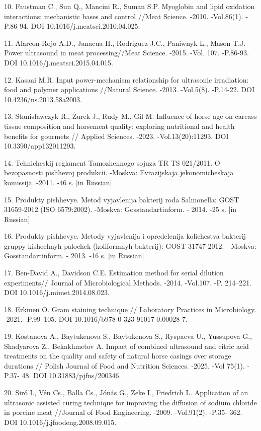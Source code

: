 \begin{refs}
10. Faustman C., Sun Q., Mancini R., Suman S.P. Myoglobin and lipid
oxidation interactions: mechanistic bases and control //Meat Science.
-2010. -Vol.86(1). -P.86-94. DOI 10.1016/j.meatsci.2010.04.025.

11. Alarcon-Rojo A.D., Janacua H., Rodriguez J.C., Paniwnyk L., Mason
T.J. Power ultrasound in meat processing//Meat Science. -2015. -Vol.
107. -P.86-93. DOI 10.1016/j.meatsci.2015.04.015.

12. Kasaai M.R. Input power-mechanism relationship for ultrasonic
irradiation: food and polymer applications //Natural Science. -2013.
-Vol.5(8). -P.14-22. DOI 10.4236/ns.2013.58a2003.

13. Stanisławczyk R., Żurek J., Rudy M., Gil M. Influence of horse age
on carcass tissue composition and horsemeat quality: exploring
nutritional and health benefits for gourmets // Applied Sciences. -2023.
-Vol.13(20):11293. DOI 10.3390/app132011293.

14. Tehnicheskij reglament Tamozhennogo sojuza TR TS 021/2011. O
bezopasnosti pishhevoj produkcii. -Moskva: Evrazijskaja jekonomicheskaja
komissija. -2011. -46 s. {[}in Russian{]}

15. Produkty pishhevye. Metod vyjavlenija bakterij roda Salmonella: GOST
31659-2012 (ISO 6579:2002). -Moskva: Gosstandartinform. - 2014. -25 s.
{[}in Russian{]}

16. Produkty pishhevye. Metody vyjavlenija i opredelenija kolichestva
bakterij gruppy kishechnyh palochek (koliformnyh bakterij): GOST
31747-2012. - Moskva: Gosstandartinform. - 2013. -16 s. {[}in Russian{]}

17. Ben-David A., Davidson C.E. Estimation method for serial dilution
experiments// Journal of Microbiological Methods. -2014. -Vol.107. -P.
214--221. DOI 10.1016/j.mimet.2014.08.023.

18. Erkmen O. Gram staining technique // Laboratory Practices in
Microbiology. -2021. -P.99--105. DOI
10.1016/b978-0-323-91017-0.00028-7.

19. Kostanova A., Baytukenova S., Baytukenova S., Ryspaeva U., Yussupova
G., Shadyarova Z., Bekakhmetov A. Impact of combined ultrasound and
citric acid treatments on the quality and safety of natural horse
casings over storage durations // Polish Journal of Food and Nutrition
Sciences. -2025. -Vol 75(1). -P.37- 48. DOI 10.31883/pjfns/200346.

20. Siró I., Vén Cs., Balla Cs., Jónás G., Zeke I., Friedrich L.
Application of an ultrasonic assisted curing technique for improving the
diffusion of sodium chloride in porcine meat //Journal of Food
Engineering. -2009. -Vol.91(2). -P.35- 362. DOI
10.1016/j.jfoodeng.2008.09.015.
\end{refs}

